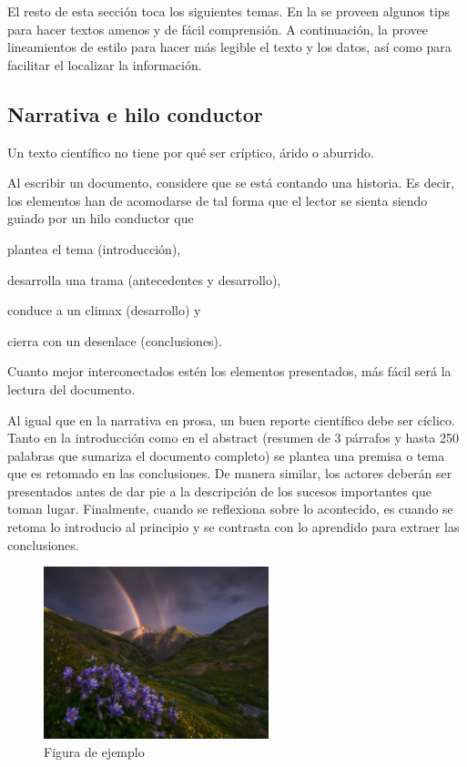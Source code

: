 \documentclass[letterpaper,10.5pt,twocolumn]{article}
\begin{document}
El resto de esta sección toca los siguientes temas.
En la  se proveen algunos tips para hacer textos amenos y de fácil comprensión.
A continuación, la  provee lineamientos de estilo para hacer más legible el texto y los datos, así como para facilitar el localizar la información.

\subsection{Narrativa e hilo conductor}
\label{sec:main-narrative}
Un texto científico no tiene por qué ser críptico, árido o aburrido.

Al escribir un documento, considere que se está contando una historia.
Es decir, los elementos han de acomodarse de tal forma que el lector se sienta siendo guiado por un hilo conductor que
\begin{enumerate*}[label=\alph*\rpar]
	\item plantea el tema (introducción),
	\item desarrolla una trama (antecedentes y desarrollo),
	\item conduce a un climax (desarrollo)
	y
	\item cierra con un desenlace (conclusiones).
\end{enumerate*}
Cuanto mejor interconectados estén los elementos presentados, más fácil será la lectura del documento.

Al igual que en la narrativa en prosa, un buen reporte científico debe ser cíclico. Tanto en la introducción como en el abstract (resumen de 3 párrafos y hasta 250 palabras que sumariza el documento completo) se plantea una premisa o tema que es retomado en las conclusiones.
De manera similar, los actores deberán ser presentados antes de dar pie a la descripción de los sucesos importantes que toman lugar.
Finalmente, cuando se reflexiona sobre lo acontecido, es cuando se retoma lo introducio al principio y se contrasta con lo aprendido para extraer las conclusiones.

\begin{figure}
	\centering
	\includegraphics[width=0.9\columnwidth,height=5cm,keepaspectratio]{img/figure.jpg}
	\caption{Figura de ejemplo}%
	\label{fig:example-figure} %
\end{figure}
\end{document}
